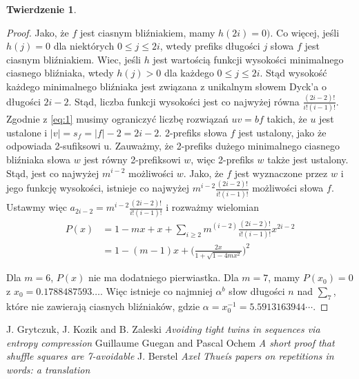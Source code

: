 \documentclass[11pt,a4paper]{article}
\theoremstyle{definition}
\newtheorem{theorem}{Twierdzenie}[section]
\begin{document}
\begin{theorem}
\begin{proof}
Jako, że $f$ jest ciasnym bliźniakiem, mamy $h(2i) = 0)$.
Co więcej, jeśli $h(j) = 0$ dla niektórych $0 \leqslant j \leqslant 2i$,
wtedy prefiks długości $j$ słowa $f$ jest ciasnym bliźniakiem.
Wiec, jeśli $h$ jest wartością funkcji wysokości minimalnego ciasnego bliźniaka,
wtedy $h(j)>0$ dla każdego $0 \leqslant j \leqslant 2i$.
Stąd wysokość każdego minimalnego bliźniaka jest związana z unikalnym słowem Dyck'a o długości $2i-2$.
Stąd, liczba funkcji wysokości jest co najwyżej równa $\frac{(2i - 2)!}{i!(i-1)!}$.
Zgodnie z \autoref{eq:1} musimy ograniczyć liczbę rozwiązań $uv=bf$ takich, że $u$ jest ustalone i $|v| = s_f = |f| -2 = 2i - 2$.
2-prefiks słowa $f$ jest ustalony, jako że odpowiada 2-sufiksowi u.
Zauważmy, że 2-prefiks dużego minimalnego ciasnego bliźniaka słowa $w$ jest równy 2-prefiksowi $w$,
więc 2-prefiks $w$ także jest ustalony. Stąd, jest co najwyżej $m^{i-2}$ możliwości $w$.
Jako, że $f$ jest wyznaczone przez $w$ i jego funkcję wysokości,
istnieje co najwyżej $m^{i-2}\frac{(2i - 2)!}{i!(i-1)!}$ możliwości słowa $f$.
Ustawmy więc $a_{2i-2} = m^{i-2}\frac{(2i - 2)!}{i!(i-1)!}$ i rozważmy wielomian
\begin{equation}
\begin{split}
P(x) & = 1 - mx + x + \sum\limits_{i \geqslant 2} m^(i-2)\frac{(2i - 2)!}{i!(i-1)!} x^{2i-2} \\
& = 1 - (m-1)x + \Big(\frac{2x}{1+ \sqrt{1-4mx^2}} \Big)^2
\end{split}
\end{equation}

Dla $m=6$, $P(x)$ nie ma dodatniego pierwiastka.
Dla $m=7$, mamy $P(x_0)=0$ z $x_0=0.1788487593\dots$.
Więc istnieje co najmniej $\alpha^b$ słow długości $n$ nad $\sum\limits_7$,
które nie zawierają ciasnych bliźniaków, gdzie $\alpha = x_0^{-1} = 5.5913163944\cdots$.

\end{proof}
\end{theorem}

\begin{thebibliography}{4}
%
J. Grytczuk, J. Kozik and B. Zaleski
\textsl{Avoiding tight twins in sequences via
entropy compression}
Guillaume Guegan and Pascal Ochem
\textsl{A short proof that shuffle squares are
7-avoidable}
J. Berstel
\textsl{Axel Thueís papers on repetitions in words: a translation}
\end{thebibliography}
\end{document}
